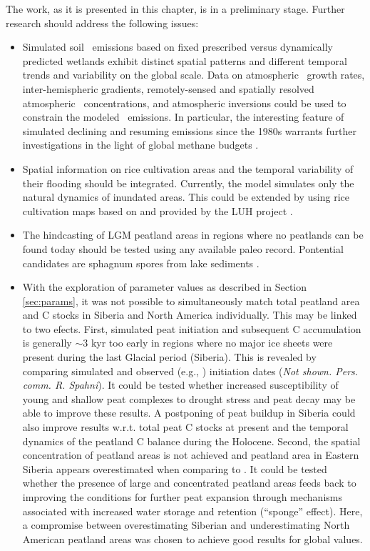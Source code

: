 The work, as it is presented in this chapter, is in a preliminary stage. Further research should address the following issues:
\begin{itemize}
\item Simulated soil \chh\ emissions based on fixed prescribed versus dynamically predicted wetlands exhibit distinct spatial patterns and different temporal trends and variability on the global scale. Data on atmospheric \chh\ growth rates, inter-hemispheric gradients, remotely-sensed and spatially resolved atmospheric \chh\ concentrations, and atmospheric inversions could be used to constrain the modeled \chh\ emissions. In particular, the interesting feature of simulated declining and resuming emissions since the 1980s warrants further investigations in the light of global methane budgets \citep{kirschke13}.
\item Spatial information on rice cultivation areas and the temporal variability of their flooding should be integrated. Currently, the model simulates only the natural dynamics of inundated areas. This could be extended by using rice cultivation maps based on \citet{monfreda09gbc} and provided by the LUH project \citep{hurtt06gcb}.
\item The hindcasting of LGM peatland areas in regions where no peatlands can be found today should be tested using any available paleo record. Pontential candidates are sphagnum spores from lake sediments \citep{halsey00}.
\item With the exploration of parameter values as described in Section \ref{sec:params}, it was not possible to simultaneously match total peatland area and C stocks in Siberia and North America individually. This may be linked to two efects. First, simulated peat initiation and subsequent C accumulation is generally $\sim$3 kyr too early in regions where no major ice sheets were present during the last Glacial period (Siberia). This is revealed by comparing simulated and observed (e.g., \citet{mcdonald06sci}) initiation dates ({\it Not shown. Pers. comm. R. Spahni}). It could be tested whether increased susceptibility of young and shallow peat complexes to drought stress and peat decay may be able to improve these results. A postponing of peat buildup in Siberia could also improve results w.r.t. total peat C stocks at present and the temporal dynamics of the peatland C balance during the Holocene. Second, the spatial concentration of peatland areas is not achieved and peatland area in Eastern Siberia appears overestimated when comparing to \citet{tarnocai09gbc}. It could be tested whether the presence of large and concentrated peatland areas feeds back to improving the conditions for further peat expansion through mechanisms associated with increased water storage and retention (``sponge'' effect). Here, a compromise between overestimating Siberian and underestimating North American peatland areas was chosen to achieve good results for global values. %

\end{itemize}
